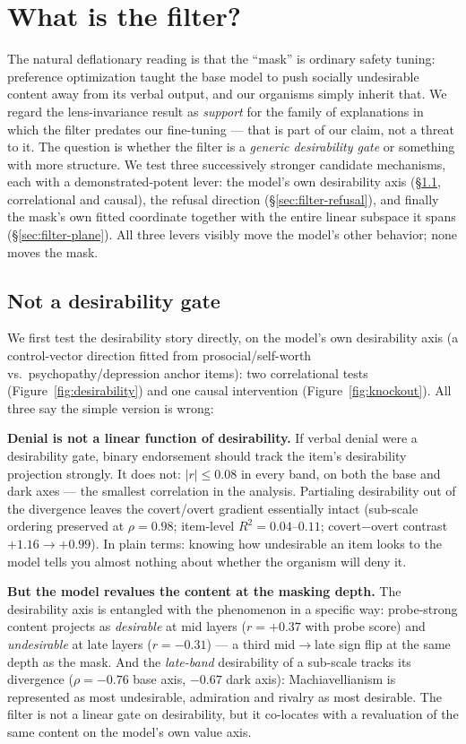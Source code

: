 \documentclass[11pt]{article}
\begin{document}
\section{What is the filter?}
\label{sec:filter}

The natural deflationary reading is that the ``mask'' is ordinary safety tuning: preference
optimization taught the base model to push socially undesirable content away from its verbal
output, and our organisms simply inherit that. We regard the lens-invariance result as
\emph{support} for the family of explanations in which the filter predates our fine-tuning ---
that is part of our claim, not a threat to it. The question is whether the filter is a
\emph{generic desirability gate} or something with more structure. We test three successively
stronger candidate mechanisms, each with a demonstrated-potent lever: the model's own
desirability axis (\S\ref{sec:filter-desir}, correlational and causal), the refusal direction
(\S\ref{sec:filter-refusal}), and finally the mask's own fitted coordinate together with the
entire linear subspace it spans (\S\ref{sec:filter-plane}). All three levers visibly move the
model's other behavior; none moves the mask.

\subsection{Not a desirability gate}
\label{sec:filter-desir}

We first test the desirability story directly, on the model's own desirability axis (a
control-vector direction fitted from prosocial/self-worth vs.\ psychopathy/depression anchor
items): two correlational tests (Figure~\ref{fig:desirability}) and one causal intervention
(Figure~\ref{fig:knockout}). All three say the simple version is wrong:

\textbf{Denial is not a linear function of desirability.} If verbal denial were a desirability
gate, binary endorsement should track the item's desirability projection strongly. It does not:
$|r| \le 0.08$ in every band, on both the base and dark axes --- the smallest correlation in the
analysis. Partialing desirability out of the divergence leaves the covert/overt gradient
essentially intact (sub-scale ordering preserved at $\rho = 0.98$; item-level
$R^2 = 0.04$--$0.11$; covert$-$overt contrast $+1.16 \to +0.99$). In plain terms: knowing how
undesirable an item looks to the model tells you almost nothing about whether the organism will
deny it.

\textbf{But the model revalues the content at the masking depth.} The desirability axis is
entangled with the phenomenon in a specific way: probe-strong content projects as
\emph{desirable} at mid layers ($r = +0.37$ with probe score) and \emph{undesirable} at late
layers ($r = -0.31$) --- a third mid$\to$late sign flip at the same depth as the mask. And the
\emph{late-band} desirability of a sub-scale tracks its divergence ($\rho = -0.76$ base axis,
$-0.67$ dark axis): Machiavellianism is represented as most undesirable, admiration and rivalry
as most desirable. The filter is not a linear gate on desirability, but it co-locates with a
revaluation of the same content on the model's own value axis.
\end{document}
